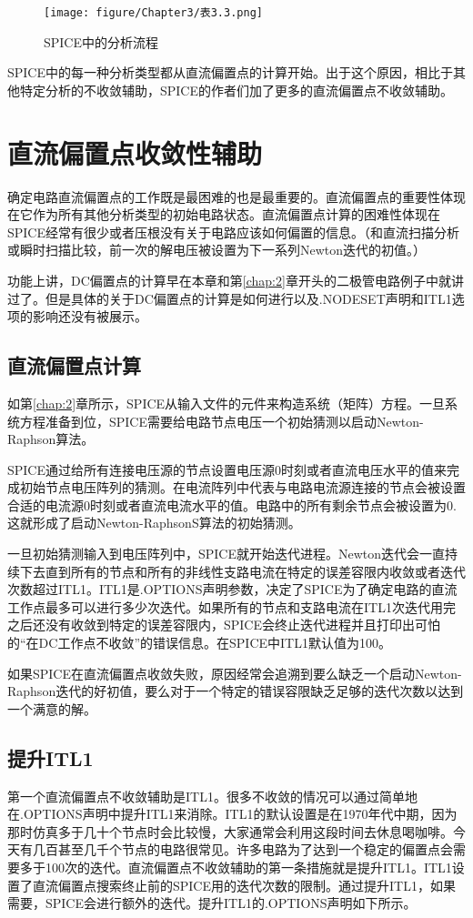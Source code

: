 \begin{figure}[htbp]
\small
    \centering
    \texttt{[image: figure/Chapter3/表3.3.png]}
    \caption{SPICE中的分析流程}
    \label{表3.3}
\end{figure}

SPICE中的每一种分析类型都从直流偏置点的计算开始。出于这个原因，相比于其他特定分析的不收敛辅助，SPICE的作者们加了更多的直流偏置点不收敛辅助。

\section{直流偏置点收敛性辅助}
确定电路直流偏置点的工作既是最困难的也是最重要的。直流偏置点的重要性体现在它作为所有其他分析类型的初始电路状态。直流偏置点计算的困难性体现在SPICE经常有很少或者压根没有关于电路应该如何偏置的信息。（和直流扫描分析或瞬时扫描比较，前一次的解电压被设置为下一系列Newton迭代的初值。）

功能上讲，DC偏置点的计算早在本章和第\ref{chap:2}章开头的二极管电路例子中就讲过了。但是具体的关于DC偏置点的计算是如何进行以及.NODESET声明和ITL1选项的影响还没有被展示。

\subsection{直流偏置点计算}
如第\ref{chap:2}章所示，SPICE从输入文件的元件来构造系统（矩阵）方程。一旦系统方程准备到位，SPICE需要给电路节点电压一个初始猜测以启动Newton-Raphson算法。

SPICE通过给所有连接电压源的节点设置电压源0时刻或者直流电压水平的值来完成初始节点电压阵列的猜测。在电流阵列中代表与电路电流源连接的节点会被设置合适的电流源0时刻或者直流电流水平的值。电路中的所有剩余节点会被设置为0.这就形成了启动Newton-RaphsonS算法的初始猜测。

一旦初始猜测输入到电压阵列中，SPICE就开始迭代进程。Newton迭代会一直持续下去直到所有的节点和所有的非线性支路电流在特定的误差容限内收敛或者迭代次数超过ITL1。ITL1是.OPTIONS声明参数，决定了SPICE为了确定电路的直流工作点最多可以进行多少次迭代。如果所有的节点和支路电流在ITL1次迭代用完之后还没有收敛到特定的误差容限内，SPICE会终止迭代进程并且打印出可怕的“在DC工作点不收敛”的错误信息。在SPICE中ITL1默认值为100。

如果SPICE在直流偏置点收敛失败，原因经常会追溯到要么缺乏一个启动Newton-Raphson迭代的好初值，要么对于一个特定的错误容限缺乏足够的迭代次数以达到一个满意的解。

\subsection{提升ITL1}
第一个直流偏置点不收敛辅助是ITL1。很多不收敛的情况可以通过简单地在.OPTIONS声明中提升ITL1来消除。ITL1的默认设置是在1970年代中期，因为那时仿真多于几十个节点时会比较慢，大家通常会利用这段时间去休息喝咖啡。今天有几百甚至几千个节点的电路很常见。许多电路为了达到一个稳定的偏置点会需要多于100次的迭代。直流偏置点不收敛辅助的第一条措施就是提升ITL1。ITL1设置了直流偏置点搜索终止前的SPICE用的迭代次数的限制。通过提升ITL1，如果需要，SPICE会进行额外的迭代。提升ITL1的.OPTIONS声明如下所示。

